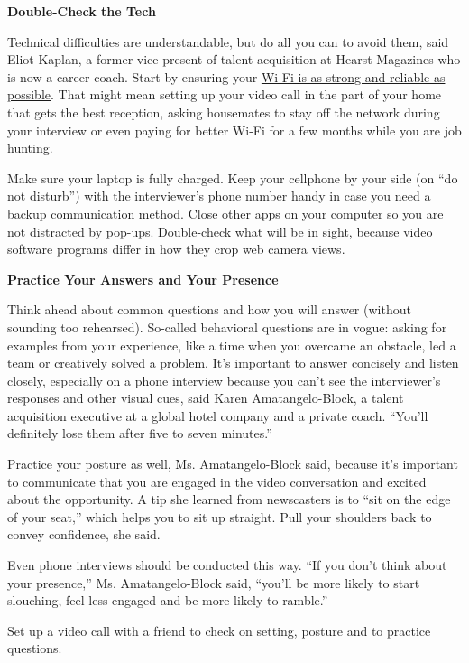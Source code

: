\textbf{Double-Check the Tech}

Technical difficulties are understandable, but do all you can to avoid
them, said Eliot Kaplan, a former vice present of talent acquisition at
Hearst Magazines who is now a career coach. Start by ensuring your
\href{https://www.nytimes3xbfgragh.onion/wirecutter/blog/make-wi-fi-suck-less-working-from-home/}{Wi-Fi
is as strong and reliable as possible}. That might mean setting up your
video call in the part of your home that gets the best reception, asking
housemates to stay off the network during your interview or even paying
for better Wi-Fi for a few months while you are job hunting.

Make sure your laptop is fully charged. Keep your cellphone by your side
(on ``do not disturb'') with the interviewer's phone number handy in
case you need a backup communication method. Close other apps on your
computer so you are not distracted by pop-ups. Double-check what will be
in sight, because video software programs differ in how they crop web
camera views.

\textbf{Practice Your Answers and Your Presence}

Think ahead about common questions and how you will answer (without
sounding too rehearsed). So-called behavioral questions are in vogue:
asking for examples from your experience, like a time when you overcame
an obstacle, led a team or creatively solved a problem. It's important
to answer concisely and listen closely, especially on a phone interview
because you can't see the interviewer's responses and other visual cues,
said Karen Amatangelo-Block, a talent acquisition executive at a global
hotel company and a private coach. ``You'll definitely lose them after
five to seven minutes.''

Practice your posture as well, Ms. Amatangelo-Block said, because it's
important to communicate that you are engaged in the video conversation
and excited about the opportunity. A tip she learned from newscasters is
to ``sit on the edge of your seat,'' which helps you to sit up straight.
Pull your shoulders back to convey confidence, she said.

Even phone interviews should be conducted this way. ``If you don't think
about your presence,'' Ms. Amatangelo-Block said, ``you'll be more
likely to start slouching, feel less engaged and be more likely to
ramble.''

Set up a video call with a friend to check on setting, posture and to
practice questions.


